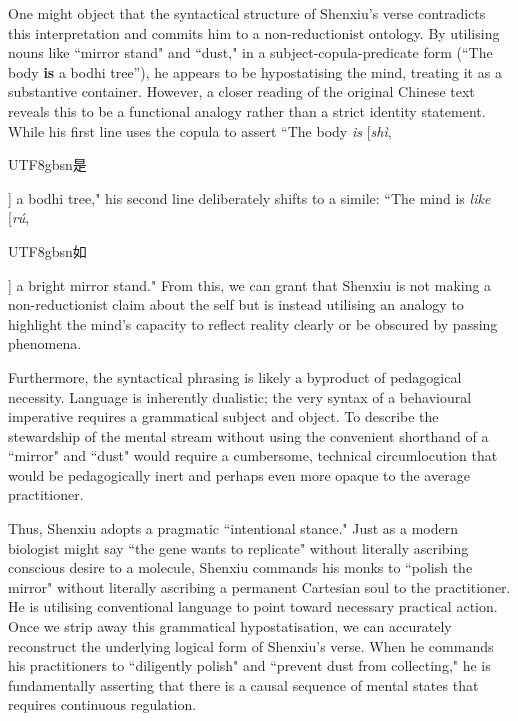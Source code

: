 One might object that the syntactical structure of Shenxiu's verse
contradicts this interpretation and commits him to a non-reductionist
ontology. By utilising nouns like ``mirror stand" and ``dust," in a
subject-copula-predicate form (``The body \textbf{is} a bodhi tree''),
he appears to be hypostatising the mind, treating it as a substantive
container. However, a closer reading of the original Chinese text
reveals this to be a functional analogy rather than a strict identity
statement. While his first line uses the copula to assert ``The body
\emph{is} {[}\emph{shì}, \begin{CJK*}{UTF8}{gbsn}是\end{CJK*}{]} a bodhi tree," his second line
deliberately shifts to a simile: ``The mind is \emph{like} {[}\emph{rú},
\begin{CJK*}{UTF8}{gbsn}如\end{CJK*}{]} a bright mirror stand." From this, we can grant that Shenxiu is
not making a non-reductionist claim about the self but is instead
utilising an analogy to highlight the mind's capacity to reflect reality
clearly or be obscured by passing phenomena.

Furthermore, the syntactical phrasing is likely a byproduct of
pedagogical necessity. Language is inherently dualistic; the very syntax
of a behavioural imperative requires a grammatical subject and object.
To describe the stewardship of the mental stream without using the
convenient shorthand of a ``mirror" and ``dust" would require a
cumbersome, technical circumlocution that would be pedagogically inert
and perhaps even more opaque to the average practitioner.

Thus, Shenxiu adopts a pragmatic ``intentional stance." Just as a modern
biologist might say ``the gene wants to replicate" without literally
ascribing conscious desire to a molecule, Shenxiu commands his monks to
``polish the mirror" without literally ascribing a permanent Cartesian
soul to the practitioner. He is utilising conventional language to point
toward necessary practical action. Once we strip away this grammatical
hypostatisation, we can accurately reconstruct the underlying logical
form of Shenxiu's verse. When he commands his practitioners to
``diligently polish" and ``prevent dust from collecting," he is
fundamentally asserting that there is a causal sequence of mental states
that requires continuous regulation.

